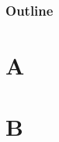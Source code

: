 \documentclass{beamer}
\begin{document}
\begin{frame}
\frametitle{Outline}
\tableofcontents
\end{frame}

\section{A}
\begin{frame}
\end{frame}

\section{B}
\begin{frame}
\end{frame}
\end{document}
